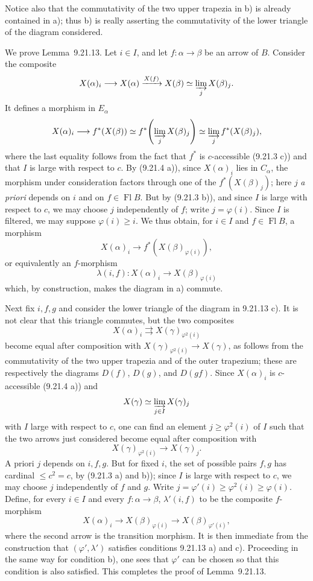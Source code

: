 \documentclass[11pt]{article}
\newcommand{\Fl}{\operatorname{Fl}}
\begin{document}
Notice also that the commutativity of the two upper trapezia in b) is already contained in a); thus b) is really asserting the commutativity of the lower triangle of the diagram considered.

We prove Lemma~9.21.13. Let $i\in I$, and let $f:\alpha\to\beta$ be an arrow of $B$. Consider the composite
\[
 X(\alpha)_i\longrightarrow X(\alpha)\xrightarrow{X(f)}X(\beta)
 \simeq \varinjlim_j X(\beta)_j.
\]
It defines a morphism in $E_\alpha$
\[
 X(\alpha)_i\longrightarrow f^\ast(X(\beta))\simeq
 f^\ast\!\left(\varinjlim_j X(\beta)_j\right)
 \simeq \varinjlim_j f^\ast(X(\beta)_j),
\]
where the last equality follows from the fact that $f^\ast$ is $c$-accessible (9.21.3 c)) and that $I$ is large with respect to $c$. By (9.21.4 a)), since $X(\alpha)_i$ lies in $C_\alpha$, the morphism under consideration factors through one of the $f^\ast(X(\beta)_j)$; here $j$ \emph{a priori} depends on $i$ and on $f\in\Fl B$. But by (9.21.3 b)), and since $I$ is large with respect to $c$, we may choose $j$ independently of $f$; write $j=\varphi(i)$. Since $I$ is filtered, we may suppose $\varphi(i)\geq i$. We thus obtain, for $i\in I$ and $f\in\Fl B$, a morphism
\[
 X(\alpha)_i\longrightarrow f^\ast(X(\beta)_{\varphi(i)}),
\]
or equivalently an $f$-morphism
\[
 \lambda(i,f):X(\alpha)_i\longrightarrow X(\beta)_{\varphi(i)}
\]
which, by construction, makes the diagram in a) commute.

Next fix $i,f,g$ and consider the lower triangle of the diagram in 9.21.13 c). It is not clear that this triangle commutes, but the two composites
\[
 X(\alpha)_i\rightrightarrows X(\gamma)_{\varphi^2(i)}
\]
become equal after composition with $X(\gamma)_{\varphi^2(i)}\to X(\gamma)$, as follows from the commutativity of the two upper trapezia and of the outer trapezium; these are respectively the diagrams $D(f)$, $D(g)$, and $D(gf)$. Since $X(\alpha)_i$ is $c$-accessible (9.21.4 a)) and
\[
 X(\gamma)\simeq \varinjlim_{j\in I}X(\gamma)_j
\]
with $I$ large with respect to $c$, one can find an element $j\geq\varphi^2(i)$ of $I$ such that the two arrows just considered become equal after composition with
\[
 X(\gamma)_{\varphi^2(i)}\longrightarrow X(\gamma)_j.
\]
A priori $j$ depends on $i,f,g$. But for fixed $i$, the set of possible pairs $f,g$ has cardinal $\leq c^2=c$, by (9.21.3 a) and b)); since $I$ is large with respect to $c$, we may choose $j$ independently of $f$ and $g$. Write $j=\varphi'(i)\geq\varphi^2(i)\geq\varphi(i)$. Define, for every $i\in I$ and every $f:\alpha\to\beta$, $\lambda'(i,f)$ to be the composite $f$-morphism
\[
 X(\alpha)_i\longrightarrow X(\beta)_{\varphi(i)}
 \longrightarrow X(\beta)_{\varphi'(i)},
\]
where the second arrow is the transition morphism. It is then immediate from the construction that $(\varphi',\lambda')$ satisfies conditions 9.21.13 a) and c). Proceeding in the same way for condition b), one sees that $\varphi'$ can be chosen so that this condition is also satisfied. This completes the proof of Lemma~9.21.13.
\end{document}
